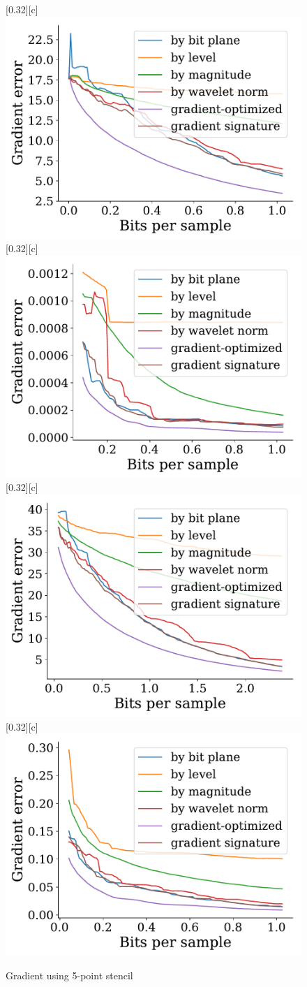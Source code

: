 \documentclass{article}
\begin{document}
\begin{figure}[htb]
        [0.32\linewidth][c]{%
                \includegraphics[width=0.3\linewidth]{img/supplementary/gradient-optimized-vismale}}
        [0.32\linewidth][c]{%
                \includegraphics[width=0.3\linewidth]{img/supplementary/gradient-optimized-karfs}}
        [0.32\linewidth][c]{%
                \includegraphics[width=0.3\linewidth]{img/supplementary/gradient-optimized-aneurism}}
        [0.32\linewidth][c]{%
                \includegraphics[width=0.3\linewidth]{img/supplementary/gradient-optimized-velocityz}}
        \caption{Gradient using 5-point stencil}
\end{figure}
\end{document}
